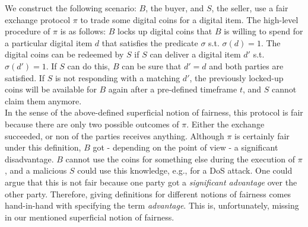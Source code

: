 \documentclass{cacthesis}
\newcounter{protocol}
\begin{document}
        We construct the following scenario: $B$, the buyer, and $S$, the seller, use a fair exchange protocol $\pi$ to trade some digital coins for a digital item. The high-level procedure of $\pi$ is as follows: $B$ locks up digital coins that $B$ is willing to spend for a particular digital item $d$ that satisfies the predicate $\sigma$ s.t. $\sigma\left( d\right) =1$. The digital coins can be redeemed by $S$ if $S$ can deliver a digital item $d'$ s.t. $\sigma\left( d'\right) =1$. If $S$ can do this, $B$ can be sure that $d' = d$ and both parties are satisfied. If $S$ is not responding with a matching $d'$, the previously locked-up coins will be available for $B$ again after a pre-defined timeframe $t$, and $S$ cannot claim them anymore. \\
        In the sense of the above-defined superficial notion of fairness, this protocol is fair because there are only two possible outcomes of $\pi$. Either the exchange succeeded, or non of the parties receives anything. 
        Although $\pi$ is certainly fair under this definition, $B$ got - depending on the point of view - a significant disadvantage. $B$ cannot use the coins for something else during the execution of $\pi$, and a malicious $S$ could use this knowledge, e.g., for a DoS attack. One could argue that this is not fair because one party got a \textit{significant advantage} over the other party. Therefore, giving definitions for different notions of fairness comes hand-in-hand with specifying the term \textit{advantage}. This is, unfortunately, missing in our mentioned superficial notion of fairness. 
        
\end{document}
